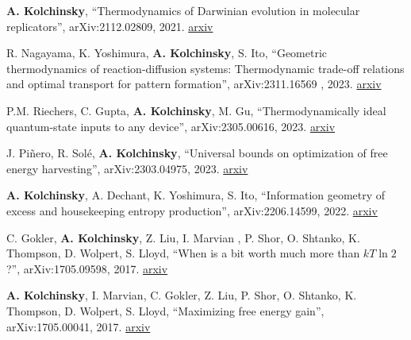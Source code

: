 
\textbf{A. Kolchinsky}, ``Thermodynamics of Darwinian evolution in molecular replicators'', arXiv:2112.02809, 2021. \href{http://arxiv.org/abs/2112.02809}{arxiv} 

R. Nagayama, K. Yoshimura, \textbf{A. Kolchinsky}, S. Ito, ``Geometric thermodynamics of reaction-diffusion systems: Thermodynamic trade-off relations and optimal transport for pattern formation'', arXiv:2311.16569 , 2023. \href{https://arxiv.org/abs/2311.16569}{arxiv}
 
P.M. Riechers, C. Gupta, \textbf{A. Kolchinsky}, M. Gu, ``Thermodynamically ideal quantum-state inputs to any device'', arXiv:2305.00616, 2023. \href{http://arxiv.org/abs/2305.00616}{arxiv}

J. Piñero, R. Solé, \textbf{A. Kolchinsky}, ``Universal bounds on optimization of free energy harvesting'', arXiv:2303.04975, 2023. \href{http://arxiv.org/abs/2303.04975}{arxiv}

\textbf{A. Kolchinsky}, A. Dechant, K. Yoshimura, S. Ito, 
``Information geometry of excess and housekeeping entropy production'', arXiv:2206.14599, 2022. \href{https://arxiv.org/abs/2206.14599}{arxiv}

C. Gokler, \textbf{A. Kolchinsky}, Z. Liu, I. Marvian , P. Shor, O. Shtanko, K. Thompson, D. Wolpert, S. Lloyd, ``When is a bit worth much more than $kT \ln 2$?'', arXiv:1705.09598, 2017. \href{https://arxiv.org/abs/1705.09598}{arxiv}

\textbf{A. Kolchinsky}, I. Marvian, C. Gokler, Z. Liu, P. Shor, O. Shtanko, K. Thompson, D. Wolpert, S. Lloyd, ``Maximizing free energy gain'', arXiv:1705.00041, 2017. \href{https://arxiv.org/abs/1705.00041}{arxiv}

